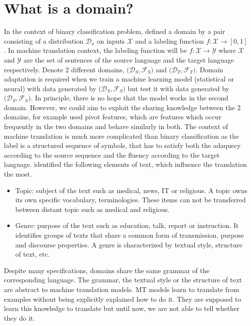 \section{What is a domain?}
\label{sec:domain}
In the context of binary classification problem, \citet{Shai10A} defined a domain by a pair consisting of a distribution $\mathcal{D}_x$ on inputs $\mathcal{X}$ and a labeling function $f: \mathcal{X} \rightarrow [0,1]$. In machine translation context, the labeling function will be $f: \mathcal{X} \rightarrow \mathcal{Y}$ where $\mathcal{X}$ and $\mathcal{Y}$ are the set of sentences of the source language and the target language respectively. Denote 2 different domains, $\big( \mathcal{D}_S, \mathcal{F}_S \big)$ and $\big( \mathcal{D}_T, \mathcal{F}_T \big)$. Domain adaptation is required when we train a machine learning model (statistical or neural) with data generated by $\big(\mathcal{D}_S, \mathcal{F}_S \big)$ but test it with data generated by $\big(\mathcal{D}_S, \mathcal{F}_S \big)$. In principle, there is no hope that the model works in the second domain. However, we could aim to exploit the sharing knowledge between the 2 domains, for example \citet{Blitzer06Domain} used pivot features, which are features which occur frequently in the two domains and behave similarly in both. The context of machine translation is much more complicated than binary classification as the label is a structured sequence of symbols, that has to satisfy both the adaquecy according to the source sequence and the fluency according to the target language. \cite{Wees15Whats,Wees17Whats} identified the following elements of text, which influence the translation the most.
\begin{itemize}
	\item Topic: subject of the text such as medical, news, IT or religious. A topic owns its own specific vocabulary, terminologies. These items can not be transferred between distant topic such as medical and religious.
	\item Genre: purpose of the text such as education, talk, report or instruction. It identifies groups of texts that share a common form of transmission, purpose and discourse properties. A genre is characterized by textual style, structure of text, etc.
\end{itemize}

Despite many specifications, domains share the same grammar of the corresponding language. The grammar, the textual style or the structure of text are abstract to machine translation models. MT models learn to translate from examples without being explicitly explained how to do it. They are supposed to learn this knowledge to translate but until now, we are not able to tell whether they do it.

